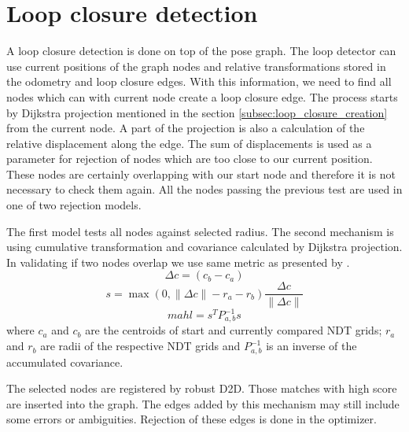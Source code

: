 \section{Loop closure detection}
\label{sec:LoopClosureMetric}
A loop closure detection is done on top of the pose graph. The loop detector can use current positions of the graph nodes and relative transformations stored in the odometry and loop closure edges. With this information, we need to find all nodes which can with current node create a loop closure edge. The process starts by Dijkstra projection mentioned in the section \ref{subsec:loop_closure_creation} from the current node. A part of the projection is also a calculation of the relative displacement along the edge. The sum of displacements is used as a parameter for rejection of nodes which are too close to our current position. These nodes are certainly overlapping with our start node and therefore it is not necessary to check them again. All the nodes passing the previous test are used in one of two rejection models. 

The first model tests all nodes against selected radius. The second mechanism is using cumulative transformation and covariance calculated by Dijkstra projection. In validating if two nodes overlap we use same metric as presented by \cite{Olson2009Loop}.
\begin{equation}
\varDelta c = (c_{b} - c_{a})
\end{equation}
\begin{equation}
s  = \max(0,\lVert \varDelta c\rVert - r_{a} - r_{b})\frac{\varDelta c}{\lVert \varDelta c\rVert}
\end{equation}
\begin{equation}
mahl = s^{T}P_{a,b}^{-1}s
\end{equation}
where $c_{a}$ and $c_{b}$ are the centroids of start and currently compared \gls{NDT} grids; $r_{a}$ and $r_{b}$ are radii of the respective \gls{NDT} grids and $P_{a,b}^{-1}$ is an inverse of the accumulated covariance.
 
The selected nodes are registered by robust \gls{D2D}. Those matches with high score are inserted into the graph. The edges added by this mechanism may still include some errors or ambiguities. Rejection of these edges is done in the optimizer.


